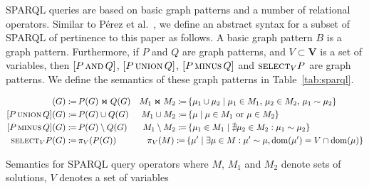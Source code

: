 \documentclass{llncs}
\newcommand{\V}{\ensuremath{\mathbf{V}}\xspace}
\newcommand{\ssyn}[3]{[\ensuremath{#1\,\textsc{#2}\,#3}]}
\newcommand{\sand}[2]{\ssyn{#1}{and}{#2}}
\newcommand{\suni}[2]{\ssyn{#1}{union}{#2}}
\newcommand{\sminus}[2]{\ssyn{#1}{minus}{#2}}
\newcommand{\ssel}[2]{\ensuremath{\textsc{select}_{#2}#1}}
\newcommand{\dom}[1]{\ensuremath{\mathrm{dom}(#1)}}
\newcommand{\com}[2]{\ensuremath{#1 \sim #2}}
\def\ojoin{\setbox0=\hbox{$\bowtie$}%
	\rule[0.18ex]{.25em}{.5pt}\llap{\rule[.9ex]{.25em}{.5pt}}}
\def\loj{\mathbin{\ojoin\mkern-5.8mu\bowtie}}
\newcommand{\da}{\ensuremath{:\nolinebreak\mkern-1.2mu\nolinebreak=}}
\begin{document}
SPARQL queries are based on basic graph patterns and a number of relational operators. Similar to Pérez et al.~\cite{PerezAG09}, we define an abstract syntax for a subset of SPARQL of pertinence to this paper as follows. A basic graph pattern $B$ is a graph pattern. Furthermore, if $P$ and $Q$ are graph patterns, and $V \subset \V$ is a set of variables, then $\sand{P}{Q}$, $\suni{P}{Q}$, $\sminus{P}{Q}$ and $\ssel{P}{V}$ are graph patterns. We define the semantics of these graph patterns in Table~\ref{tab:sparql}.

\begin{table}[t]
{\scriptsize
\begin{align*}
\sand{P}{Q}(G) \da &\, P(G) \Join Q(G) & M_1 \Join M_2 \da &\, \{ \mu_1 \cup \mu_2 \mid \mu_1 \in M_1,\, \mu_2 \in M_2,\, \com{\mu_1}{\mu_2} \} \\
\suni{P}{Q}(G) \da &\, P(G) \cup Q(G) & M_1 \cup M_2 \da &\, \{ \mu \mid \mu \in M_1\text{ or }\mu \in M_2 \} \\
\sminus{P}{Q}(G) \da &\, P(G) \setminus Q(G) &  M_1 \setminus M_2 \da &\, \{ \mu_1 \in M_1 \mid \nexists \mu_2 \in M_2 : \com{\mu_1}{\mu_2} \} \\
\ssel{P}{V}(G) \da &\, \pi_V(P(G)) & \pi_V(M) \da\,& \{ \mu' \mid \exists \mu \in M : \mu' \sim \mu, \dom{\mu'} = V \cap \dom{\mu} \}
\end{align*}}
\caption{Semantics for SPARQL query operators where $M$, $M_1$ and $M_2$ denote sets of solutions, $V$ denotes a set of variables\label{tab:sparql}}
\end{table}
\end{document}
